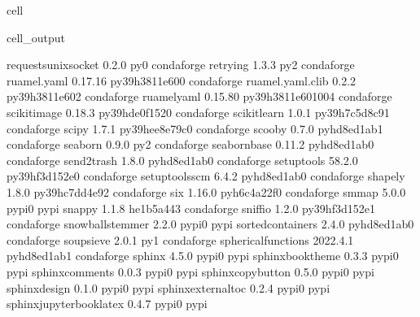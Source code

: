 \documentclass[letterpaper,table,10pt,english]{jupyterBook}
\begin{document}
\begin{sphinxuseclass}{cell}
\begin{sphinxVerbatimOutput}
\begin{sphinxuseclass}{cell_output}
\begin{sphinxVerbatim}[commandchars=\\\{\}]
requests\PYGZhy{}unixsocket       0.2.0                      py\PYGZus{}0    conda\PYGZhy{}forge
retrying                  1.3.3                      py\PYGZus{}2    conda\PYGZhy{}forge
ruamel.yaml               0.17.16          py39h3811e60\PYGZus{}0    conda\PYGZhy{}forge
ruamel.yaml.clib          0.2.2            py39h3811e60\PYGZus{}2    conda\PYGZhy{}forge
ruamel\PYGZus{}yaml               0.15.80         py39h3811e60\PYGZus{}1004    conda\PYGZhy{}forge
scikit\PYGZhy{}image              0.18.3           py39hde0f152\PYGZus{}0    conda\PYGZhy{}forge
scikit\PYGZhy{}learn              1.0.1            py39h7c5d8c9\PYGZus{}1    conda\PYGZhy{}forge
scipy                     1.7.1            py39hee8e79c\PYGZus{}0    conda\PYGZhy{}forge
scooby                    0.7.0              pyhd8ed1ab\PYGZus{}1    conda\PYGZhy{}forge
seaborn                   0.9.0                      py\PYGZus{}2    conda\PYGZhy{}forge
seaborn\PYGZhy{}base              0.11.2             pyhd8ed1ab\PYGZus{}0    conda\PYGZhy{}forge
send2trash                1.8.0              pyhd8ed1ab\PYGZus{}0    conda\PYGZhy{}forge
setuptools                58.2.0           py39hf3d152e\PYGZus{}0    conda\PYGZhy{}forge
setuptools\PYGZhy{}scm            6.4.2              pyhd8ed1ab\PYGZus{}0    conda\PYGZhy{}forge
shapely                   1.8.0            py39hc7dd4e9\PYGZus{}2    conda\PYGZhy{}forge
six                       1.16.0             pyh6c4a22f\PYGZus{}0    conda\PYGZhy{}forge
smmap                     5.0.0                    pypi\PYGZus{}0    pypi
snappy                    1.1.8                he1b5a44\PYGZus{}3    conda\PYGZhy{}forge
sniffio                   1.2.0            py39hf3d152e\PYGZus{}1    conda\PYGZhy{}forge
snowballstemmer           2.2.0                    pypi\PYGZus{}0    pypi
sortedcontainers          2.4.0              pyhd8ed1ab\PYGZus{}0    conda\PYGZhy{}forge
soupsieve                 2.0.1                      py\PYGZus{}1    conda\PYGZhy{}forge
spherical\PYGZus{}functions       2022.4.1           pyhd8ed1ab\PYGZus{}1    conda\PYGZhy{}forge
sphinx                    4.5.0                    pypi\PYGZus{}0    pypi
sphinx\PYGZhy{}book\PYGZhy{}theme         0.3.3                    pypi\PYGZus{}0    pypi
sphinx\PYGZhy{}comments           0.0.3                    pypi\PYGZus{}0    pypi
sphinx\PYGZhy{}copybutton         0.5.0                    pypi\PYGZus{}0    pypi
sphinx\PYGZhy{}design             0.1.0                    pypi\PYGZus{}0    pypi
sphinx\PYGZhy{}external\PYGZhy{}toc       0.2.4                    pypi\PYGZus{}0    pypi
sphinx\PYGZhy{}jupyterbook\PYGZhy{}latex  0.4.7                    pypi\PYGZus{}0    pypi

\end{sphinxVerbatim}
\end{sphinxuseclass}
\end{sphinxVerbatimOutput}
\end{sphinxuseclass}
\end{document}
